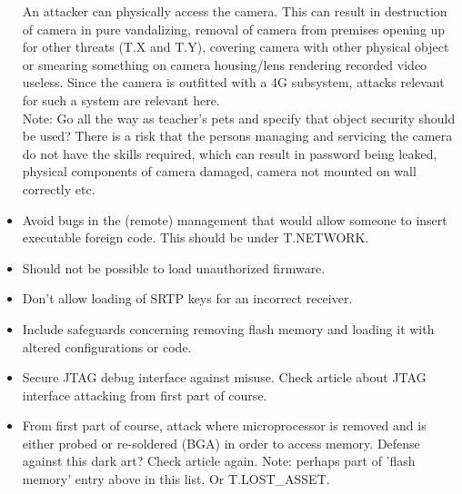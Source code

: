 \documentclass[10pt]{article}
\begin{document}
      \begin{itemize}[label={}]
         {
          An attacker can physically access the camera. This can result in
          destruction of camera in pure vandalizing, removal of camera from
          premises opening up for other threats (T.X and T.Y), covering camera
          with other physical object or smearing something on camera
          housing/lens rendering recorded video useless.
        }
         {
          Since the camera is outfitted with a 4G subsystem, attacks relevant for
          such a system are relevant here.
          \\ Note: Go all the way as teacher's pets and specify that object
          security should be used?
        }
         {
          There is a risk that the persons managing and servicing the camera do
          not have the skills required, which can result in password being
          leaked, physical components of camera damaged, camera not mounted on
          wall correctly etc.
        }
        \item{
          Avoid bugs in the (remote) management that would allow someone to
          insert executable foreign code. This should be under T.NETWORK.
        }
        \item{
          Should not be possible to load unauthorized firmware.
        }
        \item{
          Don't allow loading of SRTP keys for an incorrect receiver.
        }
        \item{
          Include safeguards concerning removing flash memory and loading it
          with altered configurations or code.
        }
        \item{
          Secure JTAG debug interface against misuse. Check article about
          JTAG interface attacking from first part of course.
        }
        \item{
          From first part of course, attack where microprocessor is removed
          and is either probed or re-soldered (BGA) in order to access memory.
          Defense against this dark art? Check article again. Note: perhaps
          part of 'flash memory' entry above in this list. Or T.LOST\_ASSET.
        }
      \end{itemize}
\end{document}

